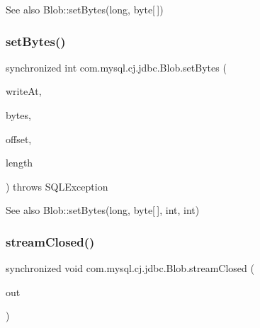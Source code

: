 \begin{DoxySeeAlso}{See also}
Blob\+::set\+Bytes(long, byte\mbox{[}$\,$\mbox{]}) 
\end{DoxySeeAlso}
\mbox{\label{classcom_1_1mysql_1_1cj_1_1jdbc_1_1_blob_a5c16cdab1cc1ff37a3b1267dec9d6b28}} 
\subsubsection{\texorpdfstring{set\+Bytes()}{setBytes()}\hspace{0.1cm}{\footnotesize\ttfamily [2/2]}}
{\footnotesize\ttfamily synchronized int com.\+mysql.\+cj.\+jdbc.\+Blob.\+set\+Bytes (\begin{DoxyParamCaption}\item[{long}]{write\+At,  }\item[{byte \mbox{[}$\,$\mbox{]}}]{bytes,  }\item[{int}]{offset,  }\item[{int}]{length }\end{DoxyParamCaption}) throws S\+Q\+L\+Exception}

\begin{DoxySeeAlso}{See also}
Blob\+::set\+Bytes(long, byte\mbox{[}$\,$\mbox{]}, int, int) 
\end{DoxySeeAlso}
\mbox{\label{classcom_1_1mysql_1_1cj_1_1jdbc_1_1_blob_a891c76fb3123f5d9f736e05d50ed1fe8}} 
\subsubsection{\texorpdfstring{stream\+Closed()}{streamClosed()}}
{\footnotesize\ttfamily synchronized void com.\+mysql.\+cj.\+jdbc.\+Blob.\+stream\+Closed (\begin{DoxyParamCaption}\item[{\mbox{\hyperlink{interfacecom_1_1mysql_1_1cj_1_1protocol_1_1_watchable_stream}{Watchable\+Stream}}}]{out }\end{DoxyParamCaption})}


